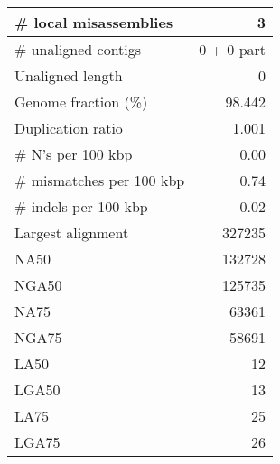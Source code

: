 \documentclass[12pt,a4paper]{article}
\begin{document}
\begin{table}[ht]
\begin{center}
\begin{tabular}{|l*{1}{|r}|}
\# local misassemblies & 3 \\ \hline
\# unaligned contigs & 0 + 0 part \\ \hline
Unaligned length & 0 \\ \hline
Genome fraction (\%) & 98.442 \\ \hline
Duplication ratio & 1.001 \\ \hline
\# N's per 100 kbp & 0.00 \\ \hline
\# mismatches per 100 kbp & 0.74 \\ \hline
\# indels per 100 kbp & 0.02 \\ \hline
Largest alignment & 327235 \\ \hline
NA50 & 132728 \\ \hline
NGA50 & 125735 \\ \hline
NA75 & 63361 \\ \hline
NGA75 & 58691 \\ \hline
LA50 & 12 \\ \hline
LGA50 & 13 \\ \hline
LA75 & 25 \\ \hline
LGA75 & 26 \\ \hline
\end{tabular}
\end{center}
\end{table}
\end{document}
